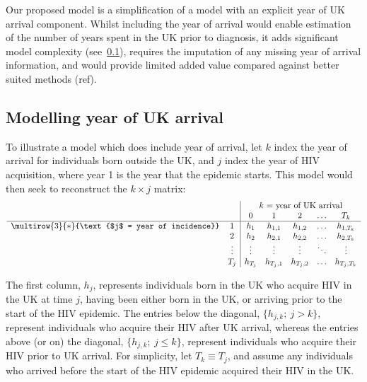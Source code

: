 \documentclass[11pt, a4paper]{article}
\begin{document}
Our proposed model is a simplification of a model with an explicit year of UK arrival component. Whilst including the year of arrival would enable estimation of the number of years spent in the UK prior to diagnosis, it adds significant model complexity (see~\ref{sec:year-of-arrival}), requires the imputation of any missing year of arrival information, and would provide limited added value compared against better suited methods (ref). 

\subsection{Modelling year of UK arrival}\label{sec:year-of-arrival}


To illustrate a model which does include year of arrival, let $k$ index the year of arrival for individuals born outside the UK, and $j$ index the year of HIV acquisition, where year 1 is the year that the epidemic starts. This model would then seek to reconstruct the $k \times j$ matrix:
%
\[
\begin{array}{cc|ccccc}
& & \multicolumn{5}{c}{\text{$k$ = year of UK arrival}} \\
& & 0 & 1 & 2 & \ldots & T_k \\
\hline
\multirow{3}{*}{\text{$j$ = year of incidence}} & 1 & h_1 & h_{1,1} & h_{1,2} & \ldots & h_{1,T_k} \\
& 2 & h_2 & h_{2,1} & h_{2,2} & \ldots & h_{2,T_k} \\
& \vdots & \vdots & \vdots & \vdots & \ddots & \vdots \\
& T_j & h_{T_j} & h_{T_j,1} & h_{T_j,2} & \ldots & h_{T_j,T_k} \\
\end{array}
\]

The first column, $h_j$, represents individuals born in the UK who acquire HIV in the UK at time $j$, having been either born in the UK, or arriving prior to the start of the HIV epidemic. The entries below the diagonal, $\{h_{j,k};\ j>k\}$, represent individuals who acquire their HIV after UK arrival, whereas the entries above (or on) the diagonal, $\{h_{j,k};\ j \leq k\}$, represent individuals who acquire their HIV prior to UK arrival. For simplicity, let $T_k \equiv T_j$, and assume any individuals who arrived before the start of the HIV epidemic acquired their HIV in the UK.
\end{document}
